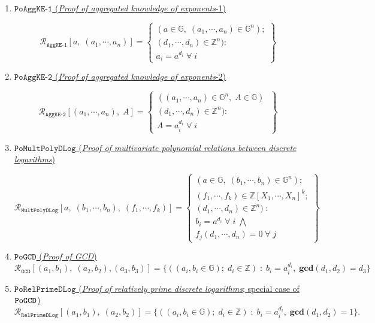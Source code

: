 \documentclass[11pt, lettersize, notitlepage, leqno, footskip=0.6cm]{article}
\newcommand{\bz}{\mathbb Z}
\newcommand{\ttt}{\texttt}
\newcommand{\mc}{\mathcal}
\newcommand{\mb}{\mathbb}
\newcommand{\mbf}{\mathbf}
\newcommand{\vs}{\vspace{-0.15cm}}
\newcommand{\GCD}{\mbf{gcd}}
\numberwithin{equation}{section}
\begin{document}
{{{\begin{enumerate}[wide, labelwidth=!, labelindent=0pt]
\item \hyperlink{AggKE-1}{$\ttt{PoAggKE-1}$ (\textit{Proof of aggregated knowledge of exponents}-1)} \vspace{-0.3cm}

\[
  \mc{R}_{{\ttt{AggKE-1}}}[a,\; (a_1,\cdots, a_n)] = \left\{\begin{array}{l}
    (a\in\mb{G},\; (a_1,\cdots, a_n)\in\mb{G}^n);\\ 
    (d_1,\cdots,d_n)\in\bz^n):  \\
    a_i = a^{d_i}\;\forall\; i
  \end{array}\right\}
\]


\item \hyperlink{AggKE-2}{$\ttt{PoAggKE-2}$ (\textit{Proof of aggregated knowledge of exponents}-2)} \vspace{-0.3cm}

\[
  \mc{R}_{{\ttt{AggKE-2}}}[(a_1,\cdots, a_n),\;A] = \left\{\begin{array}{l}
    ((a_1,\cdots, a_n)\in \mb{G}^n,\; A\in\mb{G})\;\\ 
    (d_1,\cdots,d_n)\in\bz^n) :  \\
     A = a_i^{d_i}\;\forall\;  i
  \end{array}\right\}
\]

\item \hyperlink{Mult}{$\ttt{PoMultPolyDLog}$ (\textit{Proof of multivariate polynomial relations between discrete logarithms})}\vspace{-0.6cm}

\[
  \mc{R}_{\ttt{MultPolyDLog}}[a,\; (b_1,\cdots, b_n),\; (f_1,\cdots,f_k)] = \left\{\begin{array}{l}
    (a\in\mb{G},\; (b_1,\cdots, b_n)\in\mb{G}^n);\\
    (f_1,\cdots,f_k)\in\bz[X_1,\cdots,X_n]^k;\\ 
    (d_1,\cdots,d_n)\in\bz^n)\;: \\
    b_i = a^{d_i}\;\forall\; i\;\bigwedge \;\\   f_j(d_1,\cdots,d_n) = 0\;\forall\; j 
  \end{array}\right\}
\]


\item \hyperlink{GCD}{$\ttt{PoGCD}$ (\textit{Proof of GCD})} \vspace{-0.15cm} $$\mc{R}_{{\ttt{GCD}}}[(a_1,b_1),\; (a_2,b_2),(a_3,b_3)] = \{((a_i, b_i\in\mb{G});\;d_i\in\bz)\;:\; b_i = a_i^{d_i},\;\GCD(d_1,d_2)=d_3  \} $$


\item \hyperlink{RP}{$\ttt{PoRelPrimeDLog}$ (\textit{Proof of relatively prime discrete logarithms}; special case of $\tt{PoGCD}$)} \vs $$ \mc{R}_{\ttt{RelPrimeDLog}}[(a_1,b_1),\;(a_2,b_2)] = \{((a_i, b_i\in\mb{G});\;d_i\in\bz)\;:\; b_i = a_i^{d_i},\;\GCD(d_1,d_2)=1 \} .$$



\end{enumerate}}}}
\end{document}
